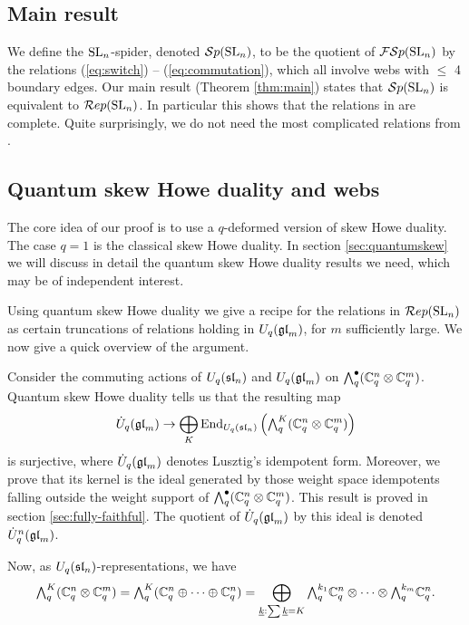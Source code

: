 \documentclass[11pt]{amsart}
\begin{document}
\subsection{Main result}
We define the $\SL_n$-spider, denoted $\Sp(\SL_n) $, to be the quotient of $ \FSp(\SL_n) $ by the relations (\ref{eq:switch}) -- (\ref{eq:commutation}), which all involve webs with $\le $ 4 boundary edges.  Our main result (Theorem \ref{thm:main}) states that $ \Sp(\SL_n) $ is equivalent to $ \Rep(\SL_n) $.  In particular this shows that the relations in \cite{0704.1503} are complete.  Quite surprisingly, we do not need the most complicated relations from \cite{0704.1503}.

\subsection{Quantum skew Howe duality and webs}
The core idea of our proof is to use a $q$-deformed version of skew Howe duality. The case $q=1$ is the classical skew Howe duality. In section \ref{sec:quantumskew} we will discuss in detail the quantum skew Howe duality results we need, which may be of independent interest.

Using quantum skew Howe duality we give a recipe for the relations in $\Rep(\SL_n)$ as certain truncations of relations holding in $U_q(\gl_m)$, for $m$ sufficiently large. We now give a quick overview of the argument.

Consider the commuting actions of $U_q(\sl_n)$ and $U_q(\gl_m)$ on $\Alt{\bullet}{q}(\bC_q^n \tensor \bC_q^m)$. Quantum skew Howe duality tells us that the resulting map
\begin{equation}\label{eq:2}
\dot{U}_q(\gl_m) \rightarrow \bigoplus_K \operatorname{End}_{U_q(\sl_n)}\left(\Alt{K}{q}(\bC_q^n \tensor \bC_q^m)\right)
\end{equation}
is surjective, where $\dot{U}_q(\gl_m)$ denotes Lusztig's idempotent form. Moreover, we prove that its kernel is the ideal generated by those weight space idempotents falling outside the weight support of $\Alt{\bullet}{q}(\bC_q^n \tensor \bC_q^m)$. This result is proved in section \ref{sec:fully-faithful}. The quotient of $\dot{U}_q(\gl_m)$ by this ideal is denoted $\dot{U}_q^n(\gl_m)$.

Now, as $U_q(\sl_n)$-representations, we have
\begin{equation}\label{eq:3}
\Alt{K}{q}(\bC_q^n \tensor \bC_q^m)  = \Alt{K}{q}(\bC_q^n \directSum \cdots \directSum \bC_q^n) = \DirectSum_{\underline{k}: \sum \underline{k} = K} \Alt{k_1}{q} \bC_q^n \tensor \cdots \tensor \Alt{k_m}{q} \bC_q^n.
\end{equation}
\end{document}
